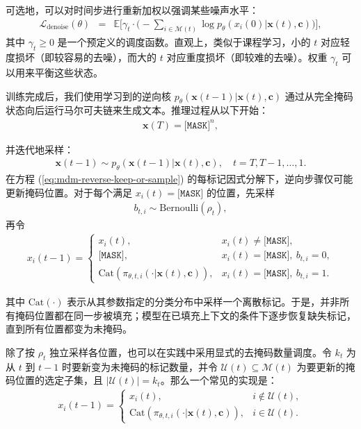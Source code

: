 \noindent 可选地，可以对时间步进行重新加权以强调某些噪声水平：
\begin{eqnarray}
\mathcal{L}_{\text{denoise}}(\theta)
& = &
\mathbb{E}\Bigg[
\gamma_t \cdot
\Big(-\sum_{i\in \mathcal{M}(t)} \log p_\theta(x_i(0)| \mathbf{x}(t),\mathbf{c})\Big)
\Bigg],
\label{eq:mdm-denoise-ce-weighted}
\end{eqnarray}
其中 $\gamma_t\ge 0$ 是一个预定义的调度函数。直观上，类似于课程学习，小的 $t$ 对应轻度损坏（即较容易的去噪），而大的 $t$ 对应重度损坏（即较难的去噪）。权重 $\gamma_t$ 可以用来平衡这些状态。

训练完成后，我们使用学习到的逆向核 $p_\theta(\mathbf{x}(t-1)| \mathbf{x}(t),\mathbf{c})$ 通过从完全掩码状态向后运行马尔可夫链来生成文本。推理过程从以下开始：
\begin{eqnarray}
\mathbf{x}(T) = \texttt{[MASK]}^n,
\end{eqnarray}

\noindent 并迭代地采样：
\begin{eqnarray}
\mathbf{x}(t-1) \sim p_\theta(\mathbf{x}(t-1)| \mathbf{x}(t),\mathbf{c}), \quad t=T,T-1,\dots,1.
\label{eq:mdm-sampling-chain}
\end{eqnarray}
在方程 (\ref{eq:mdm-reverse-keep-or-sample}) 的每标记因式分解下，逆向步骤仅可能更新掩码位置。对于每个满足 $x_i(t)=\texttt{[MASK]}$ 的位置，先采样
\begin{eqnarray}
b_{t,i}\sim\mathrm{Bernoulli}(\rho_t),
\end{eqnarray}
再令
\begin{eqnarray}
x_i(t-1) =
\begin{cases}
x_i(t), & x_i(t)\neq \texttt{[MASK]},\\
\texttt{[MASK]}, & x_i(t)=\texttt{[MASK]},\ b_{t,i}=0,\\
\mathrm{Cat}\!\left(\pi_{\theta,t,i}( \cdot | \mathbf{x}(t),\mathbf{c})\right),
& x_i(t)=\texttt{[MASK]},\ b_{t,i}=1.
\end{cases}
\end{eqnarray}

\noindent 其中 $\mathrm{Cat}(\cdot)$ 表示从其参数指定的分类分布中采样一个离散标记。于是，并非所有掩码位置都在同一步被填充；模型在已填充上下文的条件下逐步恢复缺失标记，直到所有位置都变为未掩码。

除了按 $\rho_t$ 独立采样各位置，也可以在实践中采用显式的去掩码数量调度。令 $k_t$ 为从 $t$ 到 $t-1$ 时要新变为未掩码的标记数量，并令 $\mathcal{U}(t)\subseteq \mathcal{M}(t)$ 为要更新的掩码位置的选定子集，且 $|\mathcal{U}(t)| = k_t$。那么一个常见的实现是：
\begin{eqnarray}
x_i(t-1) =
\begin{cases}
x_i(t), & i\notin \mathcal{U}(t),\\
\mathrm{Cat}\!\left(\pi_{\theta,t,i}(\cdot | \mathbf{x}(t),\mathbf{c})\right), & i\in \mathcal{U}(t).
\end{cases}
\label{eq:mdm-partial-update}
\end{eqnarray}

